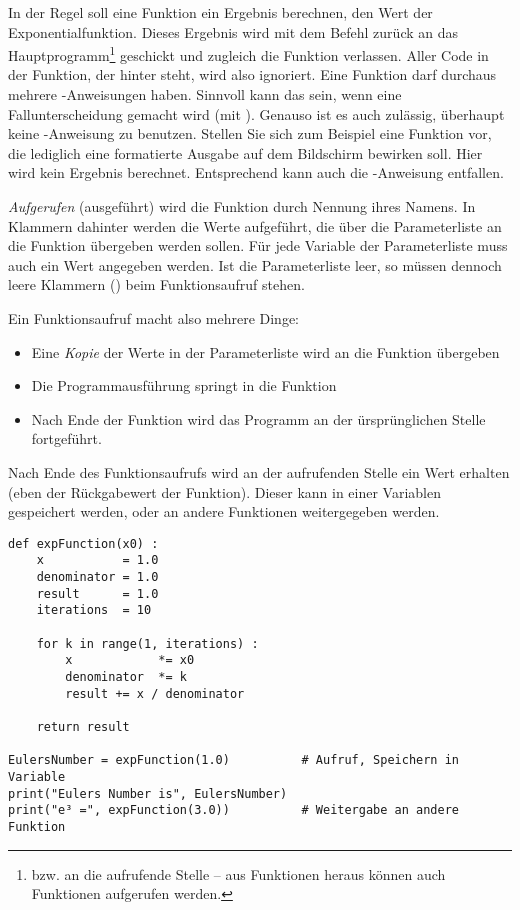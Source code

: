 In der Regel soll eine Funktion ein Ergebnis berechnen, \eg den Wert der Exponentialfunktion. Dieses Ergebnis wird mit dem Befehl  zurück an das Hauptprogramm\footnote{bzw. an die aufrufende Stelle -- aus Funktionen heraus können auch Funktionen aufgerufen werden.} geschickt und zugleich die Funktion verlassen. Aller Code in der Funktion, der hinter  steht, wird also ignoriert. Eine Funktion darf durchaus mehrere -Anweisungen haben. Sinnvoll kann das sein, wenn eine Fallunterscheidung gemacht wird (\eg mit ). Genauso ist es auch zulässig, überhaupt keine -Anweisung zu benutzen. Stellen Sie sich zum Beispiel eine Funktion vor, die lediglich eine formatierte Ausgabe auf dem Bildschirm bewirken soll. Hier wird kein Ergebnis berechnet. Entsprechend kann auch die -Anweisung entfallen.

\emph{Aufgerufen} (\ie ausgeführt) wird die Funktion durch Nennung ihres Namens. In Klammern dahinter werden die Werte aufgeführt, die über die Parameterliste an die Funktion übergeben werden sollen. Für jede Variable der Parameterliste muss auch ein Wert angegeben werden. Ist die Parameterliste leer, so müssen dennoch leere Klammern () beim Funktionsaufruf stehen.

Ein Funktionsaufruf macht also mehrere Dinge:
\begin{itemize}
\item Eine \emph{Kopie} der Werte in der Parameterliste wird an die Funktion übergeben
\item Die Programmausführung springt in die Funktion
\item Nach Ende der Funktion wird das Programm an der ürsprünglichen Stelle fortgeführt.
\end{itemize}
Nach Ende des Funktionsaufrufs wird an der aufrufenden Stelle ein Wert erhalten (eben der Rückgabewert der Funktion). Dieser kann in einer Variablen gespeichert werden, oder an andere Funktionen weitergegeben werden.

\begin{codebox}
\begin{verbatim}
def expFunction(x0) :
    x           = 1.0
    denominator = 1.0
    result      = 1.0
    iterations  = 10
  
    for k in range(1, iterations) :
        x            *= x0
        denominator  *= k
        result += x / denominator
    
    return result

EulersNumber = expFunction(1.0)          # Aufruf, Speichern in Variable
print("Eulers Number is", EulersNumber)
print("e³ =", expFunction(3.0))          # Weitergabe an andere Funktion
\end{verbatim}
\end{codebox}

